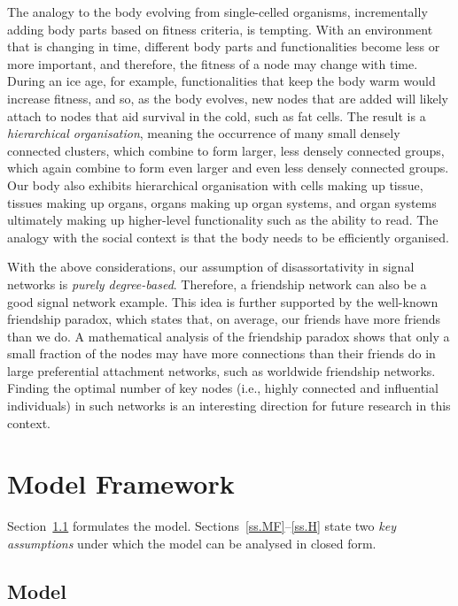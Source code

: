 \documentclass[11pt]{article}
\numberwithin{equation}{section}
\begin{document}
The analogy to the body evolving from single-celled organisms, incrementally adding body parts based on fitness criteria, is tempting. With an environment that is changing in time, different body parts and functionalities become less or more important, and therefore, the fitness of a node may change with time. During an ice age, for example, functionalities that keep the body warm would increase fitness, and so, as the body evolves, new nodes that are added will likely attach to nodes that aid survival in the cold, such as fat cells. The result is a \emph{hierarchical organisation}, meaning the occurrence of many small densely connected clusters, which combine to form larger, less densely connected groups, which again combine to form even larger and even less densely connected groups. Our body also exhibits hierarchical organisation with cells making up tissue, tissues making up organs, organs making up organ systems, and organ systems ultimately making up higher-level functionality such as the ability to read. The analogy with the social context is that the body needs to be efficiently organised.

With the above considerations, our assumption of disassortativity in signal networks is \emph{purely degree-based}. Therefore, a friendship network can also be a good signal network example. This idea is further supported by the well-known friendship paradox, which states that, on average, our friends have more friends than we do. A mathematical analysis of the friendship paradox \cite{HHP} shows that only a small fraction of the nodes may have more connections than their friends do in large preferential attachment networks, such as worldwide friendship networks. Finding the optimal number of key nodes (i.e., highly connected and influential individuals) in such networks is an interesting direction for future research in this context.




\section{Model Framework}
\label{s.modass}

Section~\ref{ss.model} formulates the model. Sections~\ref{ss.MF}--\ref{ss.H} state two \emph{key assumptions} under which the model can be analysed in closed form.   


\subsection{Model}
\label{ss.model}
\end{document}
